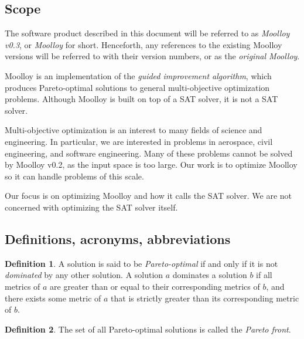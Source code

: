 \documentclass[11pt]{article}
\theoremstyle{definition}
\newtheorem{mydef}{Definition}
\begin{document}
\subsection{Scope}\label{sec:scope}

The software product described in this document will be referred to as
\textit{Moolloy v0.3}, or \textit{Moolloy} for short. Henceforth, any
references to the existing Moolloy versions will be referred to with
their version numbers, or as the \textit{original Moolloy}.

Moolloy is an implementation of the \textit{guided improvement
algorithm}, which produces Pareto-optimal solutions to general
multi-objective optimization problems. Although Moolloy is built on top
of a SAT solver, it is not a SAT solver.

Multi-objective optimization is an interest to many fields of science
and engineering. In particular, we are interested in problems in
aerospace, civil engineering, and software engineering. Many of these
problems cannot be solved by Moolloy v0.2, as the input space is too
large. Our work is to optimize Moolloy so it can handle problems of
this scale.

Our focus is on optimizing Moolloy and how it calls the SAT solver. We
are not concerned with optimizing the SAT solver itself.

\subsection{Definitions, acronyms, abbreviations}\label{sec:def}

\begin{mydef}
A solution is said to be \textit{Pareto-optimal} if and only if it is
not \textit{dominated} by any other solution. A solution $a$ dominates
a solution $b$ if all metrics of $a$ are greater than or equal to their
corresponding metrics of $b$, and there exists some metric of $a$ that
is strictly greater than its corresponding metric of $b$.
\end{mydef}

\begin{mydef}
The set of all Pareto-optimal solutions is called the
\textit{Pareto front}.
\end{mydef}
\end{document}

